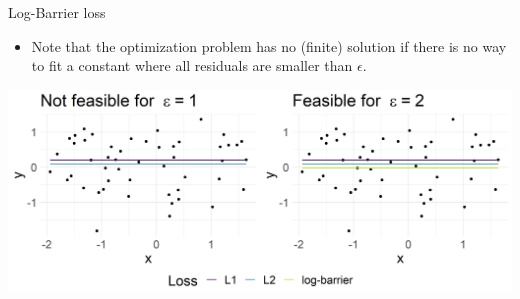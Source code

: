 \documentclass[11pt,compress,t,notes=noshow, xcolor=table]{beamer}
\begin{document}
\begin{vbframe}{Log-Barrier loss}

\begin{itemize}
 \item Note that the optimization problem has no (finite) solution if there is no way to fit a constant where all residuals are smaller than $\epsilon$.  
\end{itemize}

\vspace{0.2cm}

\begin{center}
\includegraphics[width = \textwidth]{figure/loss_logbarrier_2.png}
\end{center}

% 
% 
% 
% 
% 


\end{vbframe}
\end{document}
